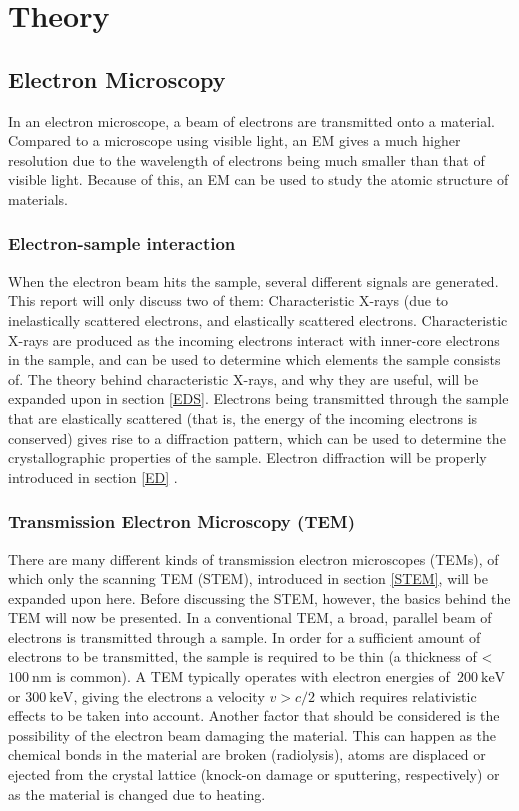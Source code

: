 \chapter{Theory}

\section{Electron Microscopy}
In an electron microscope, a beam of electrons are transmitted onto a material. Compared to a microscope using visible light, an EM gives a much higher resolution due to the wavelength of electrons being much smaller than that of visible light. Because of this, an EM can be used to study the atomic structure of materials.

	\subsection{Electron-sample interaction}
When the electron beam hits the sample, several different signals are generated. This report will only discuss two of them: Characteristic X-rays (due to inelastically scattered electrons, and elastically scattered electrons. Characteristic X-rays are produced as the incoming electrons interact with inner-core electrons in the sample, and can be used to determine which elements the sample consists of. The theory behind characteristic X-rays, and why they are useful, will be expanded upon in section \ref{EDS}. Electrons being transmitted through the sample that are elastically scattered (that is, the energy of the incoming electrons is conserved) gives rise to a diffraction pattern, which can be used to determine the crystallographic properties of the sample. Electron diffraction will be properly introduced in section \ref{ED} \cite{williams-carter}.

	\subsection{Transmission Electron Microscopy (TEM)}
There are many different kinds of transmission electron microscopes (TEMs), of which only the scanning TEM (STEM), introduced in section \ref{STEM}, will be expanded upon here. Before discussing the STEM, however, the basics behind the TEM will now be presented. In a conventional TEM, a broad, parallel beam of electrons is transmitted through a sample. In order for a sufficient amount of electrons to be transmitted, the sample is required to be thin (a thickness of <$\SI{100}{\nano\meter}$ is common). A TEM typically operates with electron energies of $\SI{200}{\kilo\electronvolt}$ or $\SI{300}{\kilo\electronvolt}$, giving the electrons a velocity $v > c/2$ which requires relativistic effects to be taken into account. Another factor that should be considered is the possibility of the electron beam damaging the material. This can happen as the chemical bonds in the material are broken (radiolysis), atoms are displaced or ejected from the crystal lattice (knock-on damage or sputtering, respectively) or as the material is changed due to heating. \cite{williams-carter}

